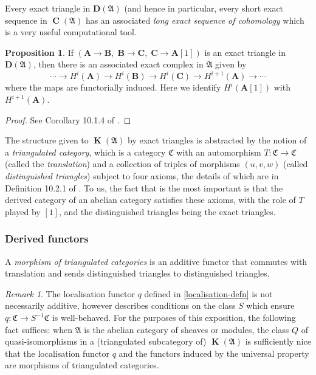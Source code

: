 \documentclass[a4paper]{article}
\theoremstyle{definition}
\newtheorem{prop}[defn]{Proposition}
\theoremstyle{remark}
\newtheorem{remark}[defn]{Remark}
\DeclareMathOperator{\Ch}{\mathbf{C}}
\DeclareMathOperator{\kom}{{\mathbf{K}}}
\newcommand{\deri}{\mathbf{D}}
\begin{document}
Every exact triangle in \(\deri(\mathfrak{A})\) (and hence in particular, every
short exact sequence in \(\Ch(\mathfrak{A})\) has an associated \textit{long
exact sequence of cohomology} which is a very useful computational tool.

\begin{prop}
    If \((\mathbf{A}\rightarrow \mathbf{B}, \; \mathbf{B}\rightarrow \mathbf{C},
    \; \mathbf{C}\rightarrow \mathbf{A}[1])\) is an exact triangle in
    \(\deri(\mathfrak{A})\), then there is an associated exact complex in
    \(\mathfrak{A}\) given by 
    \[\cdots \rightarrow H^i(\mathbf{A}) \rightarrow H^i(\mathbf{B})\rightarrow
    H^i(\mathbf{C}) \rightarrow H^{i+1}(\mathbf{A}) \rightarrow \cdots\]
    where the maps are functorially induced. Here we identify
    \(H^i(\mathbf{A}[1])\) with \(H^{i+1}(\mathbf{A})\).
    \begin{proof}
        See Corollary 10.1.4 of .
    \end{proof}
\end{prop}

The structure given to \(\kom(\mathfrak{A})\) by exact triangles is abstracted
by the notion of a \textit{triangulated category}, which is a category
\(\mathfrak{C}\) with an automorphism \(T:\mathfrak{C}\rightarrow \mathfrak{C}\)
(called the \textit{translation}) and a collection of triples of
morphisms \((u,v,w)\) (called \textit{distinguished triangles}) subject to four
axioms, the details of which are in Definition 10.2.1 of
. To us, the fact that is the most
important is that the derived category of an abelian category satisfies these
axioms, with the role of \(T\) played by \([1]\), and the distinguished
triangles being the exact triangles.

\subsubsection{Derived functors}
A \textit{morphism of triangulated categories} is an additive functor that
commutes with translation and sends distinguished triangles to distinguished
triangles. 

\begin{remark}\label{is-localisation-additive}
    The localisation functor \(q\) defined in \cref{localisation-defn} is not
    necessarily additive, however 
    describes  conditions on the class \(S\) which ensure
    \(q:\mathfrak{C}\rightarrow S^{-1}\mathfrak{C}\) is well-behaved.
    For the purposes of this exposition, the following fact suffices: when
    \(\mathfrak{A}\) is the abelian category of sheaves or modules, the class
    \(Q\) of quasi-isomorphisms in a (triangulated subcategory of)
    \(\kom(\mathfrak{A})\) is sufficiently nice that the localisation functor
    \(q\) and the functors induced by the universal property are morphisms of
    triangulated categories.
\end{remark}
\end{document}
